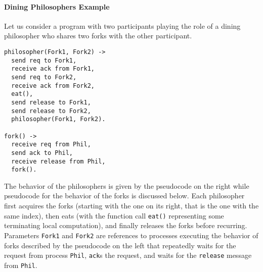 \paragraph{Dining Philosophers Example}
Let us consider a program with two participants playing the role of a
dining philosopher who shares two forks with the other participant.

\begin{lstlisting}
philosopher(Fork1, Fork2) ->
  send req to Fork1,
  receive ack from Fork1,
  send req to Fork2,
  receive ack from Fork2,
  eat(),
  send release to Fork1,
  send release to Fork2,
  philosopher(Fork1, Fork2).

fork() ->
  receive req from Phil,
  send ack to Phil,
  receive release from Phil,
  fork().
\end{lstlisting}
%
%

%
The behavior of the philosophers is given by the pseudocode on the
right while pseudocode for the behavior of the forks is discussed below.
Each philosopher first acquires the forks (starting with the one on
its right, that is the one with the same index), then eats (with the
function call \lstinline{eat()} representing some terminating local
computation), and finally releases the forks before recurring.
Parameters \lstinline{Fork1} and \lstinline{Fork2} are references to
processes executing the behavior of forks described by the pseudocode on the left
that repeatedly waits for the request from process \lstinline{Phil},
\lstinline{ack}s the request, and waits for the \lstinline{release}
message from \lstinline{Phil}.


